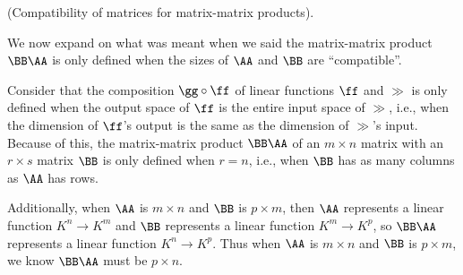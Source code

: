 \begin{remark}
    (Compatibility of matrices for matrix-matrix products). 
    
    We now expand on what was meant when we said the matrix-matrix product $\BB \AA$ is only defined when the sizes of $\AA$ and $\BB$ are ``compatible''.
    
    Consider that the composition $\gg \circ \ff$ of linear functions $\ff$ and $\gg$ is only defined when the output space of $\ff$ is the entire input space of $\gg$, i.e., when the dimension of $\ff$'s output is the same as the dimension of $\gg$'s input. Because of this, the matrix-matrix product $\BB \AA$ of an $m \times n$ matrix with an $r \times s$ matrix $\BB$ is only defined when $r = n$, i.e., when $\BB$ has as many columns as $\AA$ has rows.

    Additionally, when $\AA$ is $m \times n$ and $\BB$ is $p \times m$, then $\AA$ represents a linear function $K^n \rightarrow K^m$ and $\BB$ represents a linear function $K^m \rightarrow K^p$, so $\BB \AA$ represents a linear function $K^n \rightarrow K^p$. Thus when $\AA$ is $m \times n$ and $\BB$ is $p \times m$, we know $\BB \AA$ must be $p \times n$.
\end{remark}

